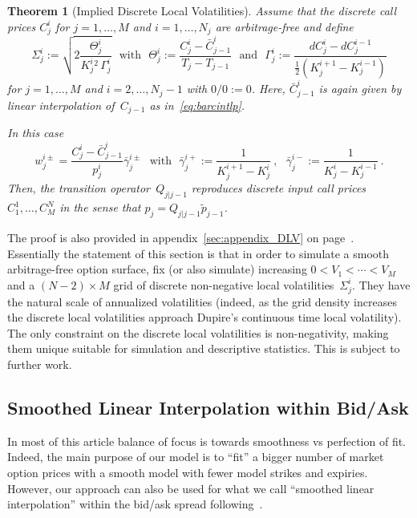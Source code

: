 \documentclass[twoside]{article}
\theoremstyle{plain}
\newtheorem{theorem}{Theorem}[section]        %
\theoremstyle{definition}
\theoremstyle{remark}
\begin{document}
\begin{theorem}[Implied Discrete Local Volatilities]\label{th:dlvtoQ}
Assume that the discrete call prices $C^i_j$ for $j=1,\ldots,M$ and $i=1,\ldots,N_j$
are arbitrage-free and define
    \begin{equation}\label{eq:dlv2}
        \Sigma^i_j := \sqrt{ 2 \frac{  \Theta_j^i }{ K^i_j{}^2 \, \Gamma_j^i } }
        \ \ \ \mbox{with}\ \ \
        \Theta_j^i :=\frac{ C_j^i - \bar C_{j-1}^i }{ T_j - T_{j-1}}
        \ \ \ \mbox{and}\ \ \ 
        \Gamma_j^i := \frac{ dC_j^i - dC_j^{i-1} }{ \frac12 (K_j^{i+1} - K_j^{i-1}) } 
    \end{equation}
    for $j=1,\ldots,M$ and $i=2,\ldots,N_j-1$ with $0/0:=0$. Here, $\bar C_{j-1}^i$
    is again given by linear interpolation of~$C_{j-1}$ as in~\eqref{eq:barcintlp}.
    
    In this case
    \begin{equation}\label{eq:wself}
        w^{i\pm}_j =  \frac{ C_j^i - \bar C_{j-1}^i }{ p_j^i }  \bar \gamma^{i\pm}_j
        \ \ \ \mbox{with} \ \ \
        \bar \gamma^{i+}_j:=\frac1{K_j^{i+1}-K_j^i}
        \ , \ \ \
        \bar \gamma^{i-}_j:=\frac1{K_j^i-K_j^{i-1}} \ .
    \end{equation}
Then, the transition operator~$Q_{j|j-1}$ reproduces discrete input call prices
$C^1_1,\ldots,C^N_M$ in the sense
that $p_j = Q_{j|j-1} \tilde p_{j-1}$.
\end{theorem}
\noindent
The proof is also provided in appendix~\ref{sec:appendix_DLV} on page~\pageref{sec:appendix_DLV}.
\\


Essentially the statement of this section is that in order to simulate a smooth arbitrage-free
option surface, fix (or also simulate) increasing $0<V_1<\cdots<V_M$ and
a $(N-2)\times M$ grid of discrete non-negative local volatilities~$\Sigma^i_j$. They have
the natural scale of annualized volatilities (indeed, as the grid density
increases the discrete local volatilities approach Dupire's continuous time
local volatility). The only constraint on the discrete local volatilities
is non-negativity, making them unique suitable for simulation and descriptive 
statistics. This is subject to further work.

\subsection{Smoothed Linear Interpolation within Bid/Ask}

In most of this article balance of focus is towards smoothness vs perfection of fit.
Indeed, the main purpose of our model is to ``fit'' a bigger number of market option prices with
a smooth model with fewer model strikes and expiries.
However, our approach can also be used for what we call ``smoothed linear interpolation'' within the bid/ask spread
following~\cite{cohen2020detecting}.
\end{document}
